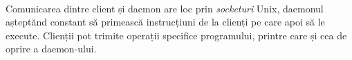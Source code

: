         \paragraph{} Comunicarea dintre client și daemon are loc prin \textit{socketuri} Unix, daemonul așteptănd constant să primească instrucțiuni de la clienți pe care apoi să le execute. Clienții pot trimite operații specifice programului, printre care și cea de oprire a daemon-ului.


